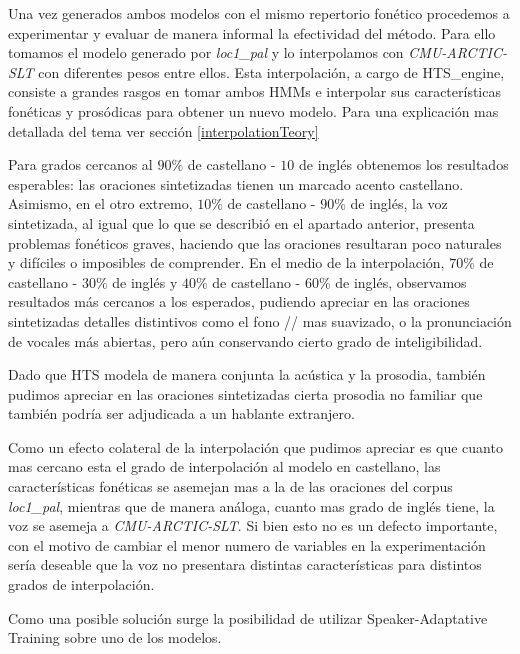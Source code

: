 Una vez generados ambos modelos con el mismo repertorio fonético procedemos a experimentar y evaluar de manera informal la efectividad del método. Para ello tomamos el modelo generado por \textit{loc1\_pal} y lo interpolamos con \textit{CMU-ARCTIC-SLT} con diferentes pesos entre ellos. Esta interpolación, a cargo de HTS\_engine, consiste a grandes rasgos en tomar ambos HMMs e interpolar sus características fonéticas y prosódicas para obtener un nuevo modelo. Para una explicación mas detallada del tema ver sección \ref{interpolationTeory}

Para grados cercanos al $90\%$ de castellano - $10$ de inglés obtenemos los resultados esperables: las oraciones sintetizadas tienen un marcado acento castellano. Asimismo, en el otro extremo, $10\%$ de castellano - $90\%$ de inglés, la voz sintetizada, al igual que lo que se describió en el apartado anterior, presenta problemas fonéticos graves, haciendo que las oraciones resultaran poco naturales y difíciles o imposibles de comprender. En el medio de la interpolación, $70\%$ de castellano - $30\%$ de inglés y $40\%$ de castellano - $60\%$ de inglés, observamos resultados más cercanos a los esperados, pudiendo apreciar en las oraciones sintetizadas detalles distintivos como el fono // mas suavizado, o la pronunciación de vocales más abiertas, pero aún conservando cierto grado de inteligibilidad.

Dado que HTS modela de manera conjunta la acústica y la prosodia, también pudimos apreciar en las oraciones sintetizadas cierta prosodia no familiar que también podría ser adjudicada a un hablante extranjero.  

Como un efecto colateral de la interpolación que pudimos apreciar es que cuanto mas cercano esta el grado de interpolación al modelo en castellano, las características fonéticas se asemejan mas a la de las oraciones del corpus \textit{loc1\_pal}, mientras que de manera análoga, cuanto mas grado de inglés tiene, la voz se asemeja a \textit{CMU-ARCTIC-SLT}. Si bien esto no es un defecto importante, con el motivo de cambiar el menor numero de variables en la experimentación sería deseable que la voz no presentara distintas características para distintos grados de interpolación.

Como una posible solución surge la posibilidad de utilizar Speaker-Adaptative Training sobre uno de los modelos.